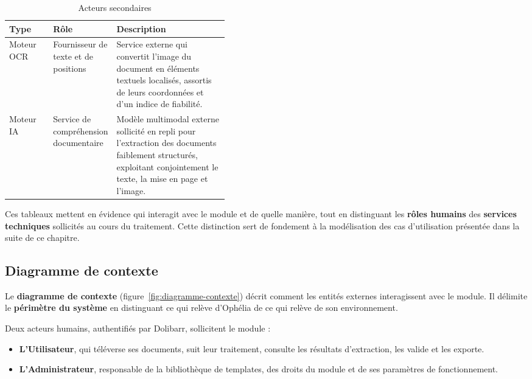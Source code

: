 \begin{table}[H]
    \centering
    \caption{Acteurs secondaires}
    \label{tab:acteurs-secondaires}
    \begin{tabularx}{\linewidth}{|p{0.20\linewidth}|p{0.22\linewidth}|X|}
        \hline
        \rowcolor[HTML]{FFCCCC}
        \textbf{Type} & \textbf{Rôle} & \textbf{Description} \\
        \hline
        Moteur OCR & Fournisseur de texte et de positions & Service externe qui convertit
        l'image du document en éléments textuels localisés, assortis de leurs coordonnées et
        d'un indice de fiabilité. \\
        \hline
        Moteur IA & Service de compréhension documentaire & Modèle multimodal externe
        sollicité en repli pour l'extraction des documents faiblement structurés, exploitant
        conjointement le texte, la mise en page et l'image. \\
        \hline
    \end{tabularx}
\end{table}

Ces tableaux mettent en évidence qui interagit avec le module et de quelle manière, tout en
distinguant les \textbf{rôles humains} des \textbf{services techniques} sollicités au cours du
traitement. Cette distinction sert de fondement à la modélisation des cas d'utilisation
présentée dans la suite de ce chapitre.

\subsection{Diagramme de contexte}
\label{subsec:diagramme-contexte}

Le \textbf{diagramme de contexte} (figure~\ref{fig:diagramme-contexte}) décrit comment les
entités externes interagissent avec le module. Il délimite le \textbf{périmètre du système} en
distinguant ce qui relève d'Ophélia de ce qui relève de son environnement.

Deux acteurs humains, authentifiés par Dolibarr, sollicitent le module :

\begin{itemize}
    \item[\opmanicule] \textbf{L'Utilisateur}, qui téléverse ses documents, suit leur
    traitement, consulte les résultats d'extraction, les valide et les exporte.

    \item[\opmanicule] \textbf{L'Administrateur}, responsable de la bibliothèque de templates,
    des droits du module et de ses paramètres de fonctionnement.
\end{itemize}


